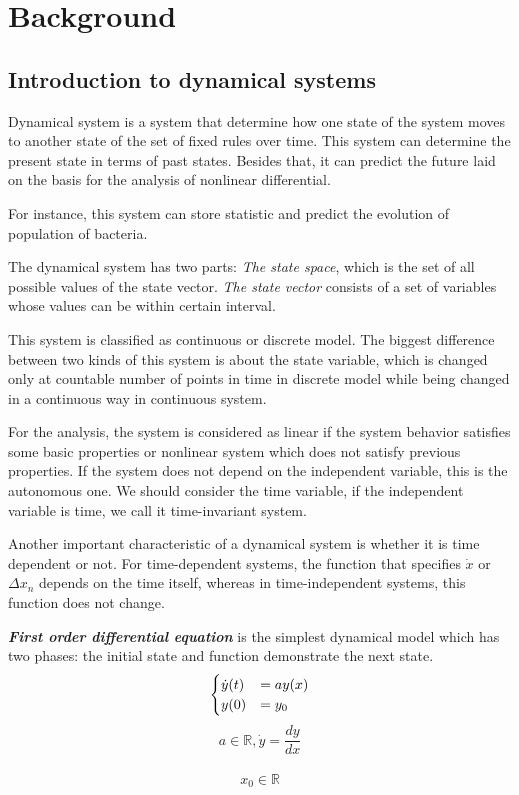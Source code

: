 \documentclass[a4paper]{article}
\numberwithin{equation}{section}
\begin{document}
\newpage
\section{Background}
\subsection{Introduction to dynamical systems}
Dynamical system is a system that determine how one state of the system moves to another state of the set of fixed rules over time. This system can determine the present state in terms of past states. Besides that, it can predict the future laid on the basis for the analysis of nonlinear differential.

For instance, this system can store statistic and predict the evolution of population of bacteria.

The dynamical system has two parts: \emph {The state space}, which is the set of all possible values of the state vector. \emph{The state vector} consists of a set of variables whose values can be within certain interval.

This system is classified as continuous or discrete model. The biggest difference between two kinds of this system is about the state variable, which is changed only at countable number of points in time in discrete model while being changed in a continuous way in continuous system.

For the analysis, the system is considered as linear if the system behavior satisfies some basic properties or nonlinear system which does not satisfy previous properties. If the system does not depend on the independent variable, this is the autonomous one. We should consider the time variable, if the independent variable is time, we call it time-invariant system.


Another important characteristic of a dynamical system is whether it is time dependent or not.
For time-dependent systems, the function that specifies \(\dot{x}\) or \(\Delta{x_n}\) depends on the time itself, whereas in time-independent systems, this function does not change.

\textbf{\emph{First order differential equation}} is the simplest dynamical model which has two phases: the initial state and function demonstrate the next state.
\begin{equation*}
  \begin{cases}
    $$\dot{y}(t)  &  = ay(x)$$ \\
    $$y(0)          & = y_0$$
  \end{cases}
\end{equation*}
$$a \in \mathbb{R}, \dot{y} = \frac{dy}{dx}$$\\
$$x_0 \in \mathbb{R}$$
\end{document}
